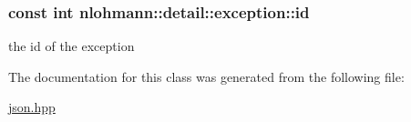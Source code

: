 \subsubsection[{\texorpdfstring{id}{id}}]{\setlength{\rightskip}{0pt plus 5cm}const int nlohmann\+::detail\+::exception\+::id}\hypertarget{classnlohmann_1_1detail_1_1exception_a0d4589a3fb54e81646d986c05efa3b9a}{}\label{classnlohmann_1_1detail_1_1exception_a0d4589a3fb54e81646d986c05efa3b9a}


the id of the exception 



The documentation for this class was generated from the following file\+:\begin{DoxyCompactItemize}
\item 
\hyperlink{json_8hpp}{json.\+hpp}\end{DoxyCompactItemize}
